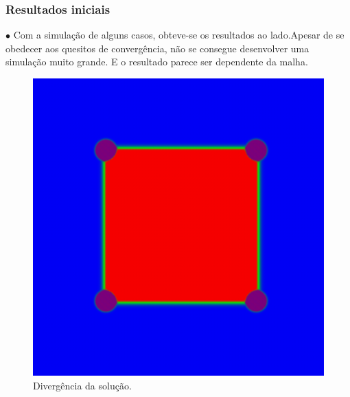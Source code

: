 \documentclass[xcolor=dvipsnames,10pt,aspectratio=169]{beamer}
\begin{document}
	
	\begin{frame}
	\frametitle{Resultados iniciais}
	\begin{minipage}[h!]{0.49\textwidth}
	$\bullet$ Com a simulação de alguns casos, obteve-se os resultados ao lado.Apesar de se obedecer aos quesitos de convergência, não se consegue desenvolver uma simulação muito grande. E o resultado parece ser dependente da malha.
	\end{minipage}
	\begin{minipage}[h!]{0.49\textwidth}
		\begin{figure}[h!]
			\centering
			\includegraphics[trim = {1cm 1cm 1cm 1cm}, clip , angle=0, scale=0.45]{preliminar_results_1}
			\caption{Divergência da solução.}
		\end{figure}
	\end{minipage}
	\end{frame}
\end{document}
